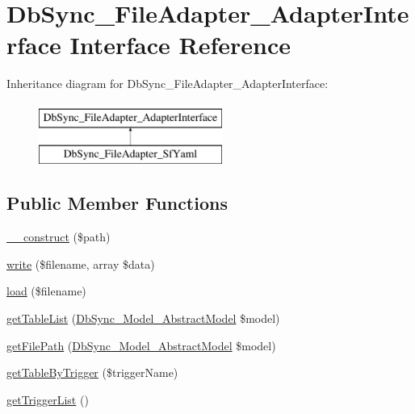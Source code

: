 \hypertarget{interfaceDbSync__FileAdapter__AdapterInterface}{
\section{DbSync\_\-FileAdapter\_\-AdapterInterface Interface Reference}
\label{interfaceDbSync__FileAdapter__AdapterInterface}
}
Inheritance diagram for DbSync\_\-FileAdapter\_\-AdapterInterface:\begin{figure}[H]
\begin{center}
\leavevmode
\includegraphics[height=2.000000cm]{interfaceDbSync__FileAdapter__AdapterInterface}
\end{center}
\end{figure}
\subsection*{Public Member Functions}
\begin{DoxyCompactItemize}
\item 
\hyperlink{interfaceDbSync__FileAdapter__AdapterInterface_abb3e223a99e5c0cd131c59acc6d82fc8}{\_\-\_\-construct} (\$path)
\item 
\hyperlink{interfaceDbSync__FileAdapter__AdapterInterface_a73ed1fa2cf12f3dc7f97981c4976b66b}{write} (\$filename, array \$data)
\item 
\hyperlink{interfaceDbSync__FileAdapter__AdapterInterface_a04bbebef17ee88c116b9ac67cc029f84}{load} (\$filename)
\item 
\hyperlink{interfaceDbSync__FileAdapter__AdapterInterface_a6a01ded2d94740261a4ff748bd900bf2}{getTableList} (\hyperlink{classDbSync__Model__AbstractModel}{DbSync\_\-Model\_\-AbstractModel} \$model)
\item 
\hyperlink{interfaceDbSync__FileAdapter__AdapterInterface_af99365b89b70a2be914b32bee7c73962}{getFilePath} (\hyperlink{classDbSync__Model__AbstractModel}{DbSync\_\-Model\_\-AbstractModel} \$model)
\item 
\hyperlink{interfaceDbSync__FileAdapter__AdapterInterface_a11acefe78ea2cf6693390d280ed98ab5}{getTableByTrigger} (\$triggerName)
\item 
\hyperlink{interfaceDbSync__FileAdapter__AdapterInterface_a3a1720dbec000385230a831e06ad8255}{getTriggerList} ()
\end{DoxyCompactItemize}


